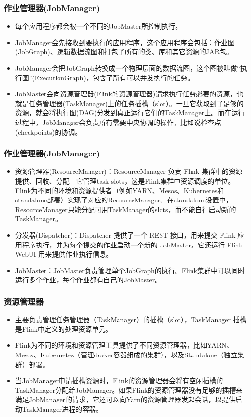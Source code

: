 \documentclass{beamer}
\begin{document}
  \begin{frame}
    \frametitle{作业管理器(JobManager)}

    \begin{itemize}
        \item 每个应用程序都会被一个不同的JobMaster所控制执行。
        \item JobManager会先接收到要执行的应用程序，这个应用程序会包括：作业图(JobGraph)、逻辑数据流图和打包了所有的类、库和其它资源的JAR包。
        \item JobManager会把JobGraph转换成一个物理层面的数据流图，这个图被叫做“执行图”(ExecutionGraph)，包含了所有可以并发执行的任务。
        \item JobMaster会向资源管理器(Flink的资源管理器)请求执行任务必要的资源，也就是任务管理器(TaskManager)上的任务插槽（slot）。一旦它获取到了足够的资源，就会将执行图(DAG)分发到真正运行它们的TaskManager上。而在运行过程中，JobManager会负责所有需要中央协调的操作，比如说检查点(checkpoints)的协调。
    \end{itemize}
  
  \end{frame}

  \begin{frame}
    \frametitle{作业管理器(JobManager)}

    \begin{itemize}
        \item 资源管理器(ResourceManager)：ResourceManager 负责 Flink 集群中的资源提供、回收、分配 - 它管理task slots，这是Flink集群中资源调度的单位。Flink为不同的环境和资源提供者（例如YARN、Mesos、Kubernetes和standalone部署）实现了对应的ResourceManager。在standalone设置中，ResourceManager只能分配可用TaskManager的slots，而不能自行启动新的TaskManager。
        \item 分发器(Dispatcher)：Dispatcher 提供了一个 REST 接口，用来提交 Flink 应用程序执行，并为每个提交的作业启动一个新的 JobMaster。它还运行 Flink WebUI 用来提供作业执行信息。
        \item JobMaster：JobMaster负责管理单个JobGraph的执行。Flink集群中可以同时运行多个作业，每个作业都有自己的JobMaster。
    \end{itemize}
  
  \end{frame}

  \begin{frame}
      \frametitle{资源管理器}
  
      \begin{itemize}
          \item 主要负责管理任务管理器（TaskManager）的插槽（slot），TaskManager 插槽是Flink中定义的处理资源单元。
          \item Flink为不同的环境和资源管理工具提供了不同资源管理器，比如YARN、Mesos、Kubernetes（管理docker容器组成的集群），以及Standalone（独立集群）部署。
          \item 当JobManager申请插槽资源时，Flink的资源管理器会将有空闲插槽的TaskManager分配给JobManager。如果Flink的资源管理器没有足够的插槽来满足JobManager的请求，它还可以向Yarn的资源管理器发起会话，以提供启动TaskManager进程的容器。
      \end{itemize}
  
  \end{frame}
\end{document}
